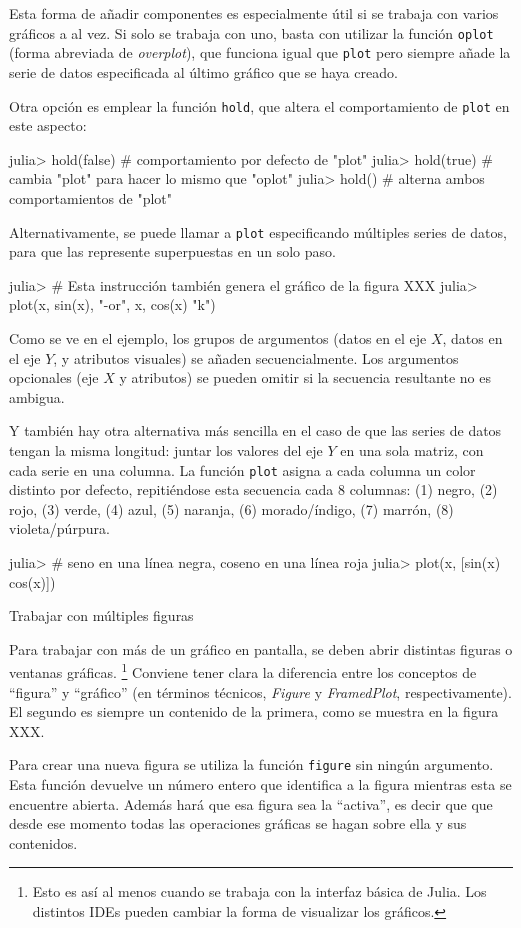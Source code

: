 ﻿\documentclass{article}
\newcommand{\jl}{\texttt}
\begin{document}
Esta forma de añadir componentes es especialmente útil si se trabaja con varios gráficos a al vez. Si solo se trabaja con uno, basta con utilizar la función \jl{oplot} (forma abreviada de \emph{overplot}), que funciona igual que \jl{plot} pero siempre añade la serie de datos especificada al último gráfico que se haya creado.

Otra opción es emplear la función \jl{hold}, que altera el comportamiento de \jl{plot} en este aspecto:

julia> hold(false) # comportamiento por defecto de "plot"
julia> hold(true)  # cambia "plot" para hacer lo mismo que "oplot"
julia> hold()      # alterna ambos comportamientos de "plot"

Alternativamente, se puede llamar a \jl{plot} especificando múltiples series de datos, para que las represente superpuestas en un solo paso.

julia> # Esta instrucción también genera el gráfico de la figura XXX
julia> plot(x, sin(x), "-or", x, cos(x) "k")

Como se ve en el ejemplo, los grupos de argumentos (datos en el eje $X$, datos en el eje $Y$, y atributos visuales) se añaden secuencialmente. Los argumentos opcionales (eje $X$ y atributos) se pueden omitir si la secuencia resultante no es ambigua.

Y también hay otra alternativa más sencilla en el caso de que las series de datos tengan la misma longitud: juntar los valores del eje $Y$ en una sola matriz, con cada serie en una columna. La función \jl{plot} asigna a cada columna un color distinto por defecto, repitiéndose esta secuencia cada 8 columnas: (1) negro, (2) rojo, (3) verde, (4) azul, (5) naranja, (6) morado/índigo, (7) marrón, (8) violeta/púrpura.

julia> # seno en una línea negra, coseno en una línea roja
julia> plot(x, [sin(x) cos(x)])


Trabajar con múltiples figuras

Para trabajar con más de un gráfico en pantalla, se deben abrir distintas figuras o ventanas gráficas.%
\footnote{%
Esto es así al menos cuando se trabaja con la interfaz básica de Julia. Los distintos IDEs pueden cambiar la forma de visualizar los gráficos.%
}
Conviene tener clara la diferencia entre los conceptos de ``figura'' y ``gráfico'' (en términos técnicos, \emph{Figure} y \emph{FramedPlot}, respectivamente). El segundo es siempre un contenido de la primera, como se muestra en la figura XXX.

Para crear una nueva figura se utiliza la función \jl{figure} sin ningún argumento. Esta función devuelve un número entero que identifica a la figura mientras esta se encuentre abierta. Además hará que esa figura sea la ``activa'', es decir que que desde ese momento todas las operaciones gráficas se hagan sobre ella y sus contenidos.
\end{document}
